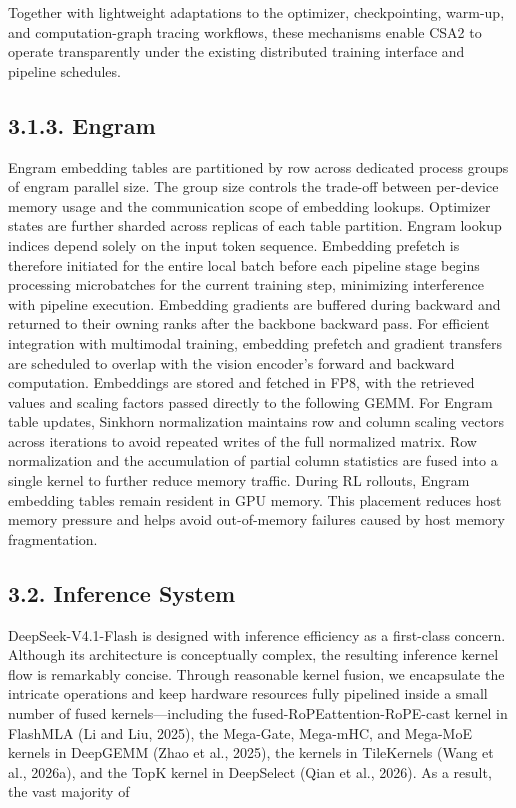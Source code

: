 \documentclass[
  10
]{article}
\begin{document}
Together with lightweight adaptations to the optimizer, checkpointing,
warm-up, and computation-graph tracing workflows, these mechanisms
enable CSA2 to operate transparently under the existing distributed
training interface and pipeline schedules.

\subsection{3.1.3. Engram}\label{engram-1}

Engram embedding tables are partitioned by row across dedicated process
groups of engram parallel size. The group size controls the trade-off
between per-device memory usage and the communication scope of embedding
lookups. Optimizer states are further sharded across replicas of each
table partition. Engram lookup indices depend solely on the input token
sequence. Embedding prefetch is therefore initiated for the entire local
batch before each pipeline stage begins processing microbatches for the
current training step, minimizing interference with pipeline execution.
Embedding gradients are buffered during backward and returned to their
owning ranks after the backbone backward pass. For efficient integration
with multimodal training, embedding prefetch and gradient transfers are
scheduled to overlap with the vision encoder's forward and backward
computation. Embeddings are stored and fetched in FP8, with the
retrieved values and scaling factors passed directly to the following
GEMM. For Engram table updates, Sinkhorn normalization maintains row and
column scaling vectors across iterations to avoid repeated writes of the
full normalized matrix. Row normalization and the accumulation of
partial column statistics are fused into a single kernel to further
reduce memory traffic. During RL rollouts, Engram embedding tables
remain resident in GPU memory. This placement reduces host memory
pressure and helps avoid out-of-memory failures caused by host memory
fragmentation.

\subsection{3.2. Inference System}\label{inference-system}

DeepSeek-V4.1-Flash is designed with inference efficiency as a
first-class concern. Although its architecture is conceptually complex,
the resulting inference kernel flow is remarkably concise. Through
reasonable kernel fusion, we encapsulate the intricate operations and
keep hardware resources fully pipelined inside a small number of fused
kernels---including the fused-RoPEattention-RoPE-cast kernel in FlashMLA
(Li and Liu, 2025), the Mega-Gate, Mega-mHC, and Mega-MoE kernels in
DeepGEMM (Zhao et al., 2025), the kernels in TileKernels (Wang et al.,
2026a), and the TopK kernel in DeepSelect (Qian et al., 2026). As a
result, the vast majority of
\end{document}
